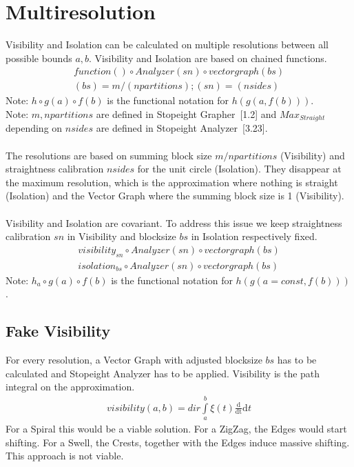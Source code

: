 \documentclass{report}
\begin{document}
\chapter{Multiresolution}
Visibility and Isolation can be calculated on multiple resolutions between all possible bounds $a,b$.
Visibility and Isolation are based on chained functions.
\begin{align*}
function() \circ Analyzer(sn) \circ vectorgraph(bs)\\
(bs)=m/(npartitions);(sn)=(nsides)
\end{align*}
Note: $h \circ g(a) \circ f(b)$ is the functional notation for $h(g(a,f(b)))$.\\
Note: $m,npartitions$ are defined in Stopeight Grapher~\cite{Grapher}[1.2] and $Max_{Straight}$ depending on $nsides$ are defined in Stopeight Analyzer~\cite{Analyzer}[3.23].\\\\
The resolutions are based on summing block size $m/npartitions$ (Visibility) and straightness calibration $nsides$ for the unit circle (Isolation). They disappear at the maximum resolution, which is the approximation where nothing is straight (Isolation) and the Vector Graph where the summing block size is 1 (Visibility).\\\\
Visibility and Isolation are covariant. To address this issue we keep straightness calibration $sn$ in Visibility and blocksize $bs$ in Isolation respectively fixed.
\begin{align}
visibility_{sn} \circ Analyzer(sn) \circ vectorgraph(bs)\\
isolation_{bs} \circ Analyzer(sn) \circ vectorgraph(bs)
\end{align}
Note: $h_{a} \circ g(a) \circ f(b)$ is the functional notation for $h(g(a=const,f(b)))$.

\section{Fake Visibility}
For every resolution, a Vector Graph with adjusted blocksize $bs$ has to be calculated and Stopeight Analyzer has to be applied.
Visibility is the path integral on the approximation.
\begin{align}
visibility(a,b)= dir \int \limits _{a}^{b} \xi(t)\frac{\mathrm{d}}{\mathrm{dt}} \mathrm{d}t
\end{align}
For a Spiral this would be a viable solution.
For a ZigZag, the Edges would start shifting.
For a Swell, the Crests, together with the Edges induce massive shifting.
This approach is not viable.
\end{document}
